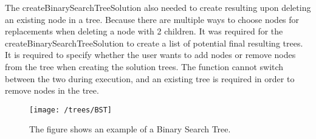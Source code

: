 The createBinarySearchTreeSolution also needed to create resulting upon deleting an existing node in a tree. Because there are multiple ways to choose nodes for replacements when deleting a node with 2 children. It was required for the createBinarySearchTreeSolution to create a list of potential final resulting trees. It is required to specify whether the user wants to add nodes or remove nodes from the tree when creating the solution trees. The function cannot switch between the two during execution, and an existing tree is required in order to remove nodes in the tree.

\begin{figure}
	\centering
	\texttt{[image: /trees/BST]}
	\caption{The figure shows an example of a Binary Search Tree.}	
	\label{fig:BST}
\end{figure}
